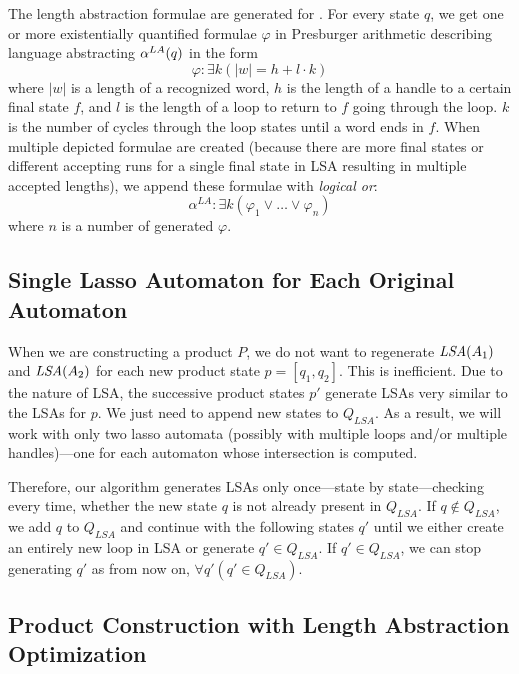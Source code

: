 The length abstraction formulae are generated for . For every state $q$, we get one or more existentially quantified formulae $\varphi$ in Presburger arithmetic describing language abstracting $\alpha^{LA}(q)$ in the form
\[
    \varphi: \exists k ( |w| = h + l \cdot k )
\]
where $|w|$ is a length of a recognized word, $h$ is the length of a handle to a certain final state $f$, and $l$ is the length of a loop to return to $f$ going through the loop. $k$ is the number of cycles through the loop states until a word ends in $f$. When multiple depicted formulae are created (because there are more final states or different accepting runs for a single final state in LSA resulting in multiple accepted lengths), we append these formulae with \emph{logical or}:
\[
    \alpha^{LA} : \exists k ( \varphi_1 \lor \ldots \lor \varphi_n )
\]
where $n$ is a number of generated $\varphi$.

\subsection{Single Lasso Automaton for Each Original Automaton}\label{sec:singleHaL}

When we are constructing a product $P$, we do not want to regenerate $\emph{LSA}(A_1)$ and $\emph{LSA}(A_2)$ for each new product state $p = [q_1, q_2]$. This is inefficient. Due to the nature of LSA, the successive product states $p'$ generate LSAs very similar to the LSAs for $p$. We just need to append new states to $Q_{LSA}$. As a result, we will work with only two lasso automata (possibly with multiple loops and/or multiple handles)---one for each automaton whose intersection is computed.

Therefore, our algorithm generates LSAs only once---state by state---checking every time, whether the new state $q$ is not already present in $Q_{LSA}$. If $q \notin Q_{LSA}$, we add $q$ to $Q_{LSA}$ and continue with the following states $q'$ until we either create an entirely new loop in LSA or generate $q' \in Q_{LSA}$. If $q' \in Q_{LSA}$, we can stop generating $q'$ as from now on, $\forall q' ( q' \in Q_{LSA})$.

\subsection{Product Construction with Length Abstraction Optimization}

